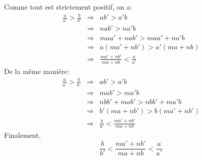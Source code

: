 Comme tout est strictement positif, on a:
\begin{eqnarray*}
  \frac{a}{a'} > \frac{b}{b'} &\Rightarrow& ab' > a'b \\
  &\Rightarrow& nab' > na'b \\
  &\Rightarrow& maa'+ nab' > maa'+na'b \\
  &\Rightarrow& a(ma'+ nb') > a'(ma+nb) \\
  &\Rightarrow& \frac{ma'+ nb'}{ma+nb} < \frac{a}{a'}
\end{eqnarray*}
De la même manière:
\begin{eqnarray*}
  \frac{a}{a'} > \frac{b}{b'} &\Rightarrow& ab' > a'b \\
  &\Rightarrow& mab' > ma'b \\
  &\Rightarrow& nbb'+ mab' > nbb'+ma'b \\
  &\Rightarrow& b'(ma + nb') > b(ma'+nb') \\
  &\Rightarrow&  \frac{b}{b'} < \frac{ma'+ nb'}{ma+nb}
\end{eqnarray*}
Finalement,
\[
\frac{b}{b'} < \frac{ma'+ nb'}{ma+nb} < \frac{a}{a'}
\]
